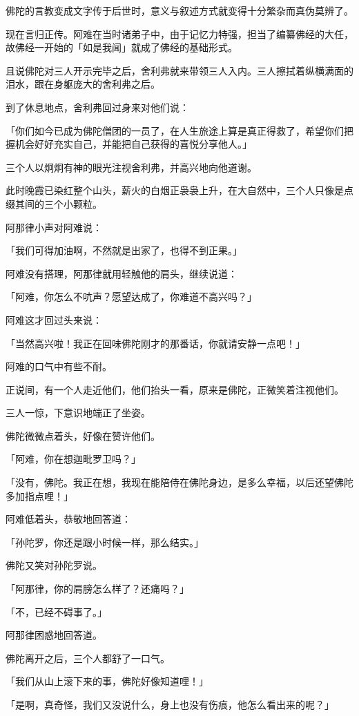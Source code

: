 \documentclass[twoside,openany]{book}
\begin{document}
佛陀的言教变成文字传于后世时，意义与叙述方式就变得十分繁杂而真伪莫辨了。

现在言归正传。阿难在当时诸弟子中，由于记忆力特强，担当了编纂佛经的大任，故佛经一开始的「如是我闻」就成了佛经的基础形式。

且说佛陀对三人开示完毕之后，舍利弗就来带领三人入内。三人擦拭着纵横满面的泪水，跟在身躯庞大的舍利弗之后。

到了休息地点，舍利弗回过身来对他们说：

「你们如今已成为佛陀僧团的一员了，在人生旅途上算是真正得救了，希望你们把握机会好好充实自己，并能把自己获得的喜悦分享他人。」

三个人以炯炯有神的眼光注视舍利弗，并高兴地向他道谢。

此时晚霞已染红整个山头，薪火的白烟正袅袅上升，在大自然中，三个人只像是点缀其间的三个小颗粒。

阿那律小声对阿难说：

「我们可得加油啊，不然就是出家了，也得不到正果。」

阿难没有搭理，阿那律就用轻触他的肩头，继续说道：

「阿难，你怎么不吭声？愿望达成了，你难道不高兴吗？」

阿难这才回过头来说：

「当然高兴啦！我正在回味佛陀刚才的那番话，你就请安静一点吧！」

阿难的口气中有些不耐。

正说间，有一个人走近他们，他们抬头一看，原来是佛陀，正微笑着注视他们。

三人一惊，下意识地端正了坐姿。

佛陀微微点着头，好像在赞许他们。

「阿难，你在想迦毗罗卫吗？」

「没有，佛陀。我正在想，我现在能陪侍在佛陀身边，是多么幸福，以后还望佛陀多加指点哩！」

阿难低着头，恭敬地回答道：

「孙陀罗，你还是跟小时候一样，那么结实。」

佛陀又笑对孙陀罗说。

「阿那律，你的肩膀怎么样了？还痛吗？」

「不，已经不碍事了。」

阿那律困惑地回答道。

佛陀离开之后，三个人都舒了一口气。

「我们从山上滚下来的事，佛陀好像知道哩！」

「是啊，真奇怪，我们又没说什么，身上也没有伤痕，他怎么看出来的呢？」
\end{document}
